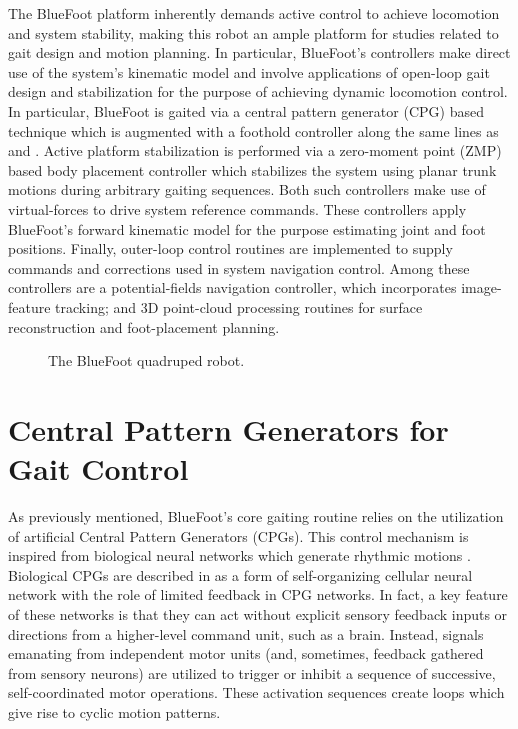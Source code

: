 		The BlueFoot platform inherently demands active control to achieve locomotion and system stability, making this robot an ample platform for studies related to gait design and motion planning. In particular, BlueFoot's controllers make direct use of the system's kinematic model and involve applications of open-loop gait design and stabilization for the purpose of achieving dynamic locomotion control. In particular, BlueFoot is gaited via a central pattern generator (CPG) based technique which is augmented with a foothold controller along the same lines as \cite{Ajallooeian2013} and \cite{Rutishauser2008}. Active platform stabilization is performed via a zero-moment point (ZMP) based body placement controller which stabilizes the system using planar trunk motions during arbitrary gaiting sequences. Both such controllers make use of virtual-forces to drive system reference commands. These controllers apply BlueFoot's forward kinematic model for the purpose estimating joint and foot positions. Finally, outer-loop control routines are implemented to supply commands and corrections used in system navigation control. Among these controllers are a potential-fields navigation controller, which incorporates image-feature tracking; and 3D point-cloud processing routines for surface reconstruction and foot-placement planning.
	
			\begin{figure}[h!]
				\centering
				\caption{The BlueFoot quadruped robot.}
				\label{fig::bluefoot_glamour}
			\end{figure}





	\section{Central Pattern Generators for Gait Control}

		As previously mentioned, BlueFoot's core gaiting routine relies on the utilization of artificial Central Pattern Generators (CPGs). This control mechanism is inspired from biological neural networks which generate rhythmic motions \cite{Ijspeert2008}.  Biological CPGs are described in \cite{Arena2000} as a form of self-organizing cellular neural network with the role of limited feedback in CPG networks. In fact, a key feature of these networks is that they can act without explicit sensory feedback inputs or directions from a higher-level command unit, such as a brain. Instead, signals emanating from independent motor units (and, sometimes, feedback gathered from sensory neurons) are utilized to trigger or inhibit a sequence of successive, self-coordinated motor operations. These activation sequences create loops which give rise to cyclic motion patterns. 

